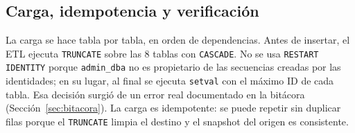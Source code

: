 \begin{table}[H]
  \centering
  \caption{Transformaciones del ETL}
  \label{tab:transformaciones}
\end{table}

\subsection{Carga, idempotencia y verificación}

La carga se hace tabla por tabla, en orden de dependencias. Antes de insertar,
el ETL ejecuta \texttt{TRUNCATE} sobre las 8 tablas con \texttt{CASCADE}. No
se usa \texttt{RESTART IDENTITY} porque \texttt{admin\_dba} no es propietario
de las secuencias creadas por las identidades; en su lugar, al final se
ejecuta \texttt{setval} con el máximo ID de cada tabla. Esa decisión surgió de
un error real documentado en la bitácora
(Sección~\ref{sec:bitacora}). La carga es idempotente: se puede repetir sin
duplicar filas porque el \texttt{TRUNCATE} limpia el destino y el snapshot del
origen es consistente.


